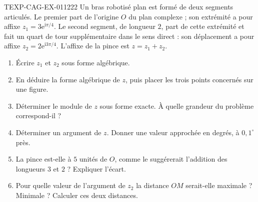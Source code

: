 \begin{exercice}{TEXP-CAG-EX-011}{2}{22}
Un bras robotisé plan est formé de deux segments articulés. Le premier part de
l'origine $O$ du plan complexe ; son extrémité a pour affixe
$z_1=3\mathrm{e}^{\mathrm{i}\pi/4}$. Le second segment, de longueur $2$, part de
cette extrémité et fait un quart de tour supplémentaire dans le sens direct :
son déplacement a pour affixe $z_2=2\mathrm{e}^{\mathrm{i}3\pi/4}$. L'affixe de la
pince est $z=z_1+z_2$.
\begin{enumerate}
  \item Écrire $z_1$ et $z_2$ sous forme algébrique.
  \item En déduire la forme algébrique de $z$, puis placer les trois points
    concernés sur une figure.
  \item Déterminer le module de $z$ sous forme exacte. À quelle grandeur du
    problème correspond-il ?
  \item Déterminer un argument de $z$. Donner une valeur approchée en degrés,
    à $0{,}1^{\circ}$ près.
  \item La pince est-elle à $5$ unités de $O$, comme le suggérerait l'addition
    des longueurs $3$ et $2$ ? Expliquer l'écart.
  \item Pour quelle valeur de l'argument de $z_2$ la distance $OM$ serait-elle
    maximale ? Minimale ? Calculer ces deux distances.
\end{enumerate}
\end{exercice}
